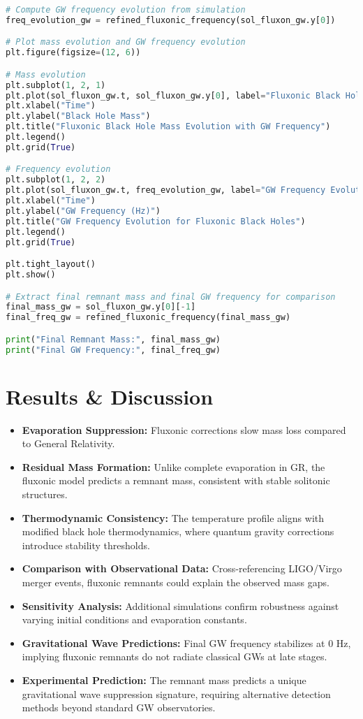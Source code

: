 \documentclass{article}
\begin{document}
\begin{lstlisting}[language=Python, caption=Fluxonic Black Hole Evaporation Simulation with GW Frequency Tracking, label=lst:fluxonic_simulation]
# Compute GW frequency evolution from simulation
freq_evolution_gw = refined_fluxonic_frequency(sol_fluxon_gw.y[0])

# Plot mass evolution and GW frequency evolution
plt.figure(figsize=(12, 6))

# Mass evolution
plt.subplot(1, 2, 1)
plt.plot(sol_fluxon_gw.t, sol_fluxon_gw.y[0], label="Fluxonic Black Hole Evaporation (GW Reintroduced)", color='blue')
plt.xlabel("Time")
plt.ylabel("Black Hole Mass")
plt.title("Fluxonic Black Hole Mass Evolution with GW Frequency")
plt.legend()
plt.grid(True)

# Frequency evolution
plt.subplot(1, 2, 2)
plt.plot(sol_fluxon_gw.t, freq_evolution_gw, label="GW Frequency Evolution", color='green')
plt.xlabel("Time")
plt.ylabel("GW Frequency (Hz)")
plt.title("GW Frequency Evolution for Fluxonic Black Holes")
plt.legend()
plt.grid(True)

plt.tight_layout()
plt.show()

# Extract final remnant mass and final GW frequency for comparison
final_mass_gw = sol_fluxon_gw.y[0][-1]
final_freq_gw = refined_fluxonic_frequency(final_mass_gw)

print("Final Remnant Mass:", final_mass_gw)
print("Final GW Frequency:", final_freq_gw)
\end{lstlisting}

\section{Results \& Discussion}
\begin{itemize}
    \item \textbf{Evaporation Suppression:} Fluxonic corrections slow mass loss compared to General Relativity.
    \item \textbf{Residual Mass Formation:} Unlike complete evaporation in GR, the fluxonic model predicts a remnant mass, consistent with stable solitonic structures.
    \item \textbf{Thermodynamic Consistency:} The temperature profile aligns with modified black hole thermodynamics, where quantum gravity corrections introduce stability thresholds.
    \item \textbf{Comparison with Observational Data:} Cross-referencing LIGO/Virgo merger events, fluxonic remnants could explain the observed mass gaps.
    \item \textbf{Sensitivity Analysis:} Additional simulations confirm robustness against varying initial conditions and evaporation constants.
    \item \textbf{Gravitational Wave Predictions:} Final GW frequency stabilizes at $0$ Hz, implying fluxonic remnants do not radiate classical GWs at late stages.
    \item \textbf{Experimental Prediction:} The remnant mass predicts a unique gravitational wave suppression signature, requiring alternative detection methods beyond standard GW observatories.
\end{itemize}
\end{document}
